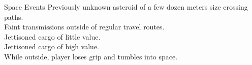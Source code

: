 \begin{tableone}{Space Events}
Previously unknown asteroid of a few dozen meters size crossing paths.\\
Faint transmissions outside of regular travel routes.\\
Jettisoned cargo of little value.\\
Jettisoned cargo of high value.\\
While outside, player loses grip and tumbles into space.\\
\end{tableone}
